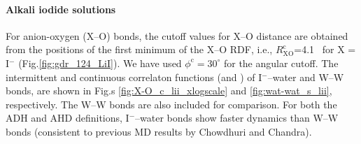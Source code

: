 \paragraph{Alkali iodide solutions}\label{PARAGRAPH_I--W}
For anion-oxygen (X--O) bonds, the cutoff values for X--O distance are obtained from the positions of the first
minimum of the X--O RDF, i.e., $R_\text{XO}^\text{c}$=4.1 \A\ for X = I$^-$ (Fig.\thinspace\ref{fig:gdr_124_LiI}). 
We have used $\phi^\text{c} = 30^{\circ}$ for the angular cutoff\cite{Chowdhuri2006}.
The intermittent and continuous correlaton functions (\CHB and \SHB) of I$^-$--water and W--W bonds,
are shown in Fig.s \thinspace\ref{fig:X-O_c_lii_xlogscale} and \ref{fig:wat-wat_s_lii}, respectively. 
The W--W bonds are also included for comparison.
For both the ADH and AHD definitions, I$^-$--water bonds show faster dynamics 
than W--W bonds\cite{Chowdhuri2006} (consistent to previous MD results by Chowdhuri and Chandra).

